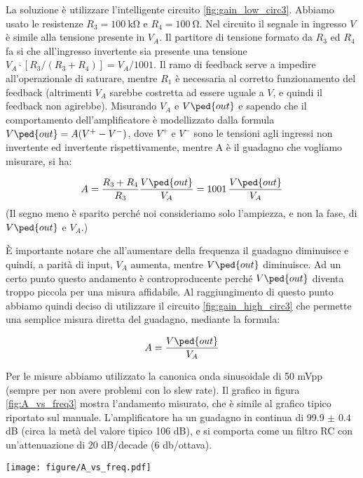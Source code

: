 La soluzione è utilizzare l'intelligente circuito \ref{fig:gain_low_circ3}. Abbiamo usato le resistenze
$R_3 = \SI{100}{\kilo\ohm}$ e $R_4 = \SI{100}{\ohm}$. Nel circuito il segnale in ingresso $V$ è simile
alla tensione presente in $V_A$. Il partitore di tensione formato da $R_3$ ed $R_4$ fa si che all'ingresso
invertente sia presente una tensione $V_A \cdot [R_3 / (R_3 + R_4)] = V_A/1001$. Il ramo di feedback serve a impedire all'operazionale di
saturare, mentre $R_1$ è necessaria al corretto funzionamento del feedback (altrimenti $V_A$ sarebbe costretta ad
essere uguale a $V$, e quindi il feedback non agirebbe). Misurando $V_A$ e $V\ped{out}$ e sapendo
che il comportamento dell'amplificatore è modellizzato dalla formula $V\ped{out} = A(V^+ - V^-)$, dove $V^+$ e $V^-$ sono
le tensioni agli ingressi non invertente ed invertente rispettivamente, mentre A è il guadagno che vogliamo
misurare, si ha:

\begin{equation}
    A = \frac{R_3 + R_4}{R_3}\frac{V\ped{out}}{V_A} = 1001\,\frac{V\ped{out}}{V_A}
\end{equation}
%
(Il segno meno è sparito perché noi consideriamo solo l'ampiezza, e non la fase, di $V\ped{out}$ e $V_A$.)

È importante notare che all'aumentare della frequenza il guadagno diminuisce e quindi, a parità
di input, $V_A$ aumenta, mentre $V\ped{out}$ diminuisce. Ad un certo punto questo andamento è controproducente
perché $V\ped{out}$ diventa troppo piccola per una misura affidabile. Al raggiungimento di questo
punto abbiamo quindi deciso di utilizzare il circuito \ref{fig:gain_high_circ3} che permette una
semplice misura diretta del guadagno, mediante la formula:

\begin{equation}
    A = \frac{V\ped{out}}{V_A}
\end{equation}

Per le misure abbiamo utilizzato la canonica onda sinusoidale di 50 mVpp (sempre per non avere
problemi con lo slew rate). Il grafico in figura \ref{fig:A_vs_freq3} mostra l'andamento misurato,
che è simile al grafico tipico riportato sul manuale. L'amplificatore ha un guadagno in continua di
99.9 $\pm$ 0.4 dB (circa la metà del valore tipico 106 dB), e si comporta come un filtro RC con un'attenuazione
di 20 dB/decade (6 db/ottava).

\begin{SCfigure*}
    \texttt{[image: figure/A\_vs\_freq.pdf]}
    \caption{Il grafico mostra l'andamento del guadagno open loop dell'amplificatore operazionale UA741
        in funzione della frequenza. Come si vede il guadagno è massimo solo in una ristretta banda di
        frequenze, fino a circa 8 Hz. Poi il guadagno diminuisce ad un decimo ogni decade.
        I punti neri sono stati rilevati con il circuito \ref{fig:gain_low_circ3} e si vede
        che a frequenze alte l'incertezza diventa cospicua, mentre
        quelli grigi sono stati misurati con il circuito \ref{fig:gain_high_circ3}. Nei punti dove l'incertezza non
        è visibile essa è minore della dimensione dei punti. Il guadagno diventa unitario a circa 1 MHz.}
    \label{fig:A_vs_freq3}
\end{SCfigure*}

